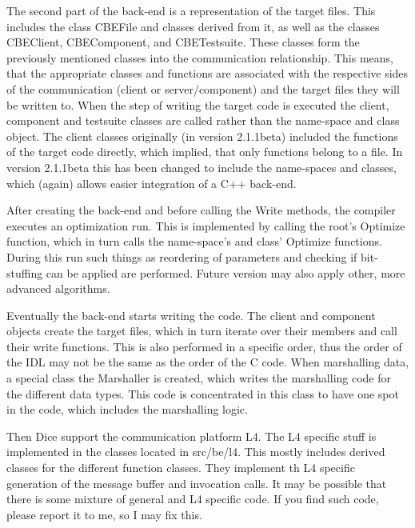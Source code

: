 The second part of the back-end is a representation of the target
files. This includes the class CBEFile and classes derived from it, as
well as the classes CBEClient, CBEComponent, and CBETestsuite. These
classes form the previously mentioned classes into the communication
relationship. This means, that the appropriate classes and functions
are associated with the respective sides of the communication (client
or server/component) and the target files they will be written
to. When the step of writing the target code is executed the client,
component and testsuite classes are called rather than the name-space
and class object. The client classes originally (in version 2.1.1beta)
included the functions of the target code directly, which implied,
that only functions belong to a file. In version 2.1.1beta this has
been changed to include the name-spaces and classes, which (again)
allows easier integration of a C++ back-end.

After creating the back-end and before calling the Write methods, the
compiler executes an optimization run. This is implemented by calling
the root's Optimize function, which in turn calls the name-space's and
class' Optimize functions. During this run such things as reordering
of parameters and checking if bit-stuffing can be applied are
performed. Future version may also apply other, more advanced
algorithms.

Eventually the back-end starts writing the code. The client and
component objects create the target files, which in turn iterate over
their members and call their write functions. This is also performed
in a specific order, thus the order of the IDL may not be the same as
the order of the C code. When marshalling data, a special class the
Marshaller is created, which writes the marshalling code for the
different data types. This code is concentrated in this class to have
one spot in the code, which includes the marshalling logic.

Then Dice support the communication platform L4. The L4 specific stuff
is implemented in the classes located in src/be/l4. This mostly
includes derived classes for the different function classes. They
implement th L4 specific generation of the message buffer and
invocation calls. It may be possible that there is some mixture of
general and L4 specific code. If you find such code, please report it
to me, so I may fix this.

